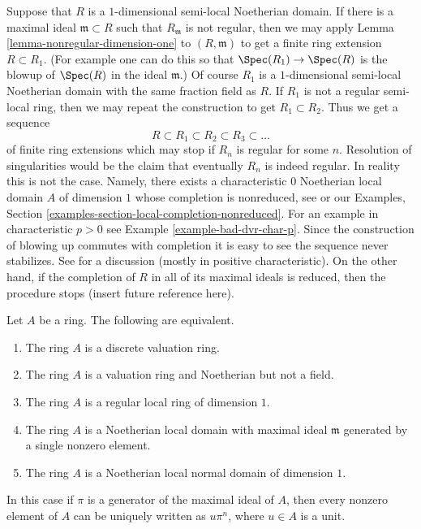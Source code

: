 \begin{remark}
\label{remark-resolution-dim-1}
Suppose that $R$ is a $1$-dimensional semi-local Noetherian domain.
If there is a maximal ideal $\mathfrak m \subset R$ such that
$R_{\mathfrak m}$ is not regular, then we may apply
Lemma \ref{lemma-nonregular-dimension-one} to $(R, \mathfrak m)$
to get a finite ring extension $R \subset R_1$.
(For example one can do this so that $\Spec(R_1) \to \Spec(R)$
is the blowup of $\Spec(R)$ in the ideal $\mathfrak m$.)
Of course $R_1$ is a $1$-dimensional semi-local Noetherian
domain with the same fraction field as $R$. If $R_1$ is not a
regular semi-local ring, then we may repeat the construction to
get $R_1 \subset R_2$. Thus we get a sequence
$$
R \subset R_1 \subset R_2 \subset R_3 \subset \ldots
$$
of finite ring extensions which may stop if $R_n$ is regular for
some $n$. Resolution of singularities would be the claim
that eventually $R_n$ is indeed regular. In reality this is not
the case. Namely, there exists a characteristic $0$
Noetherian local domain $A$ of dimension $1$ whose completion is nonreduced,
see \cite[Proposition 3.1]{Ferrand-Raynaud} or our
Examples, Section \ref{examples-section-local-completion-nonreduced}.
For an example in characteristic $p > 0$ see
Example \ref{example-bad-dvr-char-p}.
Since the construction of blowing up commutes with completion it
is easy to see the sequence never stabilizes.
See \cite{Bennett} for a discussion (mostly in positive characteristic).
On the other hand, if the completion of $R$ in all of its maximal
ideals is reduced, then the procedure stops (insert future reference
here).
\end{remark}

\begin{lemma}
\label{lemma-characterize-dvr}
Let $A$ be a ring. The following are equivalent.
\begin{enumerate}
\item The ring $A$ is a discrete valuation ring.
\item The ring $A$ is a valuation ring and Noetherian but not a field.
\item The ring $A$ is a regular local ring of dimension $1$.
\item The ring $A$ is a Noetherian local domain with maximal ideal
$\mathfrak m$ generated by a single nonzero element.
\item The ring $A$ is a Noetherian local normal domain of dimension $1$.
\end{enumerate}
In this case if $\pi$ is a generator of the maximal ideal of
$A$, then every nonzero element of $A$ can be uniquely written as
$u\pi^n$, where $u \in A$ is a unit.
\end{lemma}

